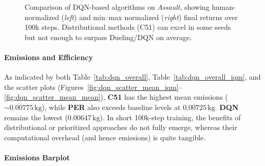 \begin{figure}
	\centering
	\quad
	\caption{Comparison of DQN-based algorithms on \textit{Assault}, 
		showing human-normalized (\textit{left}) and min--max normalized (\textit{right}) 
		final returns over 100k steps. 
		Distributional methods (C51) can excel in some seeds but not enough to surpass Dueling/DQN on average.}
	\label{fig:assault_comparison}
\end{figure}

\paragraph{Emissions and Efficiency}
As indicated by both Table~\ref{tab:dqn_overall}, Table~\ref{tab:dqn_overall_iqm}, 
and the scatter plots (Figures~\ref{fig:dqn_scatter_mean_iqm}--\ref{fig:dqn_scatter_mean_mean}), 
\textbf{C51} has the highest mean emissions ($\sim0.00775\,\mathrm{kg}$), 
while \textbf{PER} also exceeds baseline levels at $0.00725\,\mathrm{kg}$. 
\textbf{DQN} remains the lowest ($0.00647\,\mathrm{kg}$). 
In short 100k-step training, the benefits of distributional or prioritized approaches 
do not fully emerge, whereas their computational overhead (and hence emissions) is quite tangible.

\paragraph{Emissions Barplot}

